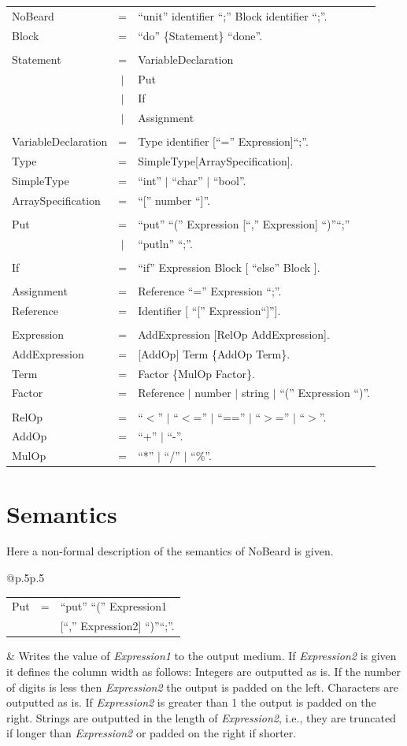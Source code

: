 \documentclass[11pt]{report}
\newcommand{\leongage}{NoBeard}
\newenvironment{grammar}[2] %
	{
		\newcommand{\completerule}[2]{##1 & = & ##2.\\}
		\newcommand{\startrule}[2]{##1 & = & ##2\\}
		\newcommand{\alternativerule}[1]{ & $|$ & ##1\\}
		\newcommand{\alternativeend}[1]{ & $|$ & ##1.\\}
		\newcommand{\finishrule}[1]{ & & ##1.\\}
		\begin{tabular}{p{#1} c p{#2}}
	}
	{	\end{tabular}
	}
\begin{document}
	\begin{grammar}{}{}
		\completerule{NoBeard}{``unit'' identifier ``;'' Block identifier ``;''}

		\completerule{Block}{``do'' \{Statement\} ``done''}

		\\

		\startrule{Statement}{VariableDeclaration}
		\alternativerule{Put}
		\alternativerule{If}
		\alternativerule{Assignment}
		\\
		\completerule{VariableDeclaration}{Type identifier [``='' Expression]``;''}
		\completerule{Type}{SimpleType[ArraySpecification]}
		\completerule{SimpleType}{``int'' $|$ ``char'' $|$ ``bool''}
		\completerule{ArraySpecification}{``['' number ``]''}
		\\
		\startrule{Put}{``put'' ``('' Expression [``,'' Expression] ``)''``;''}
		\alternativeend{``putln'' ``;''}
		\\
		\completerule{If}{``if'' Expression Block [ ``else'' Block ]}
		\\
		\completerule{Assignment}{Reference ``='' Expression ``;''}
		\completerule{Reference}{Identifier [ ``['' Expression``]'']}
		\\
		\completerule{Expression}{AddExpression [RelOp AddExpression]}
		\completerule{AddExpression}{[AddOp] Term \{AddOp Term\}}
		\completerule{Term}{Factor \{MulOp Factor\}}
		\completerule{Factor}{Reference $|$ number $|$ string $|$ ``('' Expression ``)''}
		\\
		\completerule{RelOp}{``$<$'' $|$ ``$<$='' $|$ ``=='' $|$ ``$>$='' $|$ ``$>$''}
		\completerule{AddOp}{``+'' $|$ ``-''}
		\completerule{MulOp}{``*'' $|$ ``/'' $|$ ``\%''}	
	\end{grammar}

\section{Semantics}
Here a non-formal description of the semantics of \leongage{} is given.

\noindent \begin{tabular}{@{}p{}p{}}

\begin{grammar}{}{}
	\startrule{Put}{``put'' ``('' Expression1}
	\finishrule {[``,'' Expression2] ``)''``;''}
\end{grammar}
&
Writes the value of {\em Expression1} to the output medium. If {\em Expression2} is given it defines the column width as follows: Integers are outputted as is. If the number of digits is less then {\em Expression2} the output is padded on the left. Characters are outputted as is. If {\em Expression2} is greater than 1 the output is padded on the right. Strings are outputted in the length of {\em Expression2}, i.e., they are truncated if longer than {\em Expression2} or padded on the right if shorter.
\end{tabular}
\end{document}
